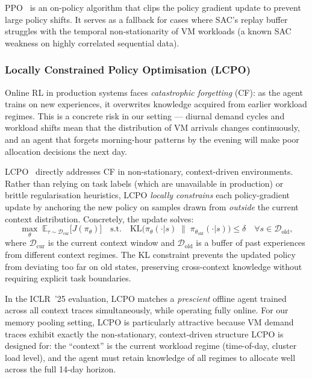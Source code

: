 \documentclass[11pt]{article}
\begin{document}
PPO~\cite{schulman2017ppo} is an on-policy algorithm that clips the policy
gradient update to prevent large policy shifts.  It serves as a fallback for
cases where SAC's replay buffer struggles with the temporal non-stationarity
of VM workloads (a known SAC weakness on highly correlated sequential data).

\subsubsection*{Locally Constrained Policy Optimisation (LCPO)}

Online RL in production systems faces \emph{catastrophic forgetting} (CF):
as the agent trains on new experiences, it overwrites knowledge acquired
from earlier workload regimes.  This is a concrete risk in our setting ---
diurnal demand cycles and workload shifts mean that the distribution of
VM arrivals changes continuously, and an agent that forgets morning-hour
patterns by the evening will make poor allocation decisions the next day.

LCPO~\cite{hamadanian2025lcpo} directly addresses CF in non-stationary,
context-driven environments.  Rather than relying on task labels (which
are unavailable in production) or brittle regularisation heuristics, LCPO
\emph{locally constrains} each policy-gradient update by anchoring the new
policy on samples drawn from \emph{outside} the current context
distribution.  Concretely, the update solves:
\[
    \max_\theta \; \mathbb{E}_{\tau \sim \mathcal{D}_{\text{cur}}}
        \bigl[J(\pi_\theta)\bigr]
    \quad \text{s.t.} \quad
    \mathrm{KL}\!\bigl(\pi_\theta(\cdot|s) \;\|\; \pi_{\theta_{\text{old}}}(\cdot|s)\bigr)
    \le \delta
    \quad \forall s \in \mathcal{D}_{\text{old}},
\]
where $\mathcal{D}_{\text{cur}}$ is the current context window and
$\mathcal{D}_{\text{old}}$ is a buffer of past experiences from different
context regimes.  The KL constraint prevents the updated policy from
deviating too far on old states, preserving cross-context knowledge without
requiring explicit task boundaries.

In the ICLR~'25 evaluation, LCPO matches a \emph{prescient} offline agent
trained across all context traces simultaneously, while operating fully
online.  For our memory pooling setting, LCPO is particularly attractive
because VM demand traces exhibit exactly the non-stationary, context-driven
structure LCPO is designed for: the ``context'' is the current workload
regime (time-of-day, cluster load level), and the agent must retain
knowledge of all regimes to allocate well across the full 14-day horizon.
\end{document}
